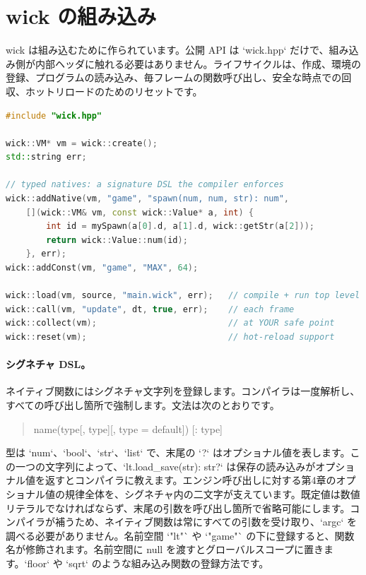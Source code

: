 \section{wick の組み込み}

wick は組み込むために作られています。公開 API は `wick.hpp` だけで、組み込み側が内部ヘッダに触れる必要はありません。ライフサイクルは、作成、環境の登録、プログラムの読み込み、毎フレームの関数呼び出し、安全な時点での回収、ホットリロードのためのリセットです。

\begin{lstlisting}[language=C++,basicstyle=\ttfamily\small,keywordstyle=\color{wkKeyword}]
#include "wick.hpp"

wick::VM* vm = wick::create();
std::string err;

// typed natives: a signature DSL the compiler enforces
wick::addNative(vm, "game", "spawn(num, num, str): num",
    [](wick::VM& vm, const wick::Value* a, int) {
        int id = mySpawn(a[0].d, a[1].d, wick::getStr(a[2]));
        return wick::Value::num(id);
    }, err);
wick::addConst(vm, "game", "MAX", 64);

wick::load(vm, source, "main.wick", err);   // compile + run top level
wick::call(vm, "update", dt, true, err);    // each frame
wick::collect(vm);                          // at YOUR safe point
wick::reset(vm);                            // hot-reload support
\end{lstlisting}

\paragraph{シグネチャ DSL。} ネイティブ関数にはシグネチャ文字列を登録します。コンパイラは一度解析し、すべての呼び出し箇所で強制します。文法は次のとおりです。

\begin{quote}
\ttfamily name(type[, type][, type = default]) [: type]
\end{quote}

\noindent
型は `num`、`bool`、`str`、`list` で、末尾の `?` はオプショナル値を表します。この一つの文字列によって、`lt.load_save(str): str?` は保存の読み込みがオプショナル値を返すとコンパイラに教えます。エンジン呼び出しに対する第4章のオプショナル値の規律全体を、シグネチャ内の二文字が支えています。既定値は数値リテラルでなければならず、末尾の引数を呼び出し箇所で省略可能にします。コンパイラが補うため、ネイティブ関数は常にすべての引数を受け取り、`argc` を調べる必要がありません。名前空間 `"lt"` や `"game"` の下に登録すると、関数名が修飾されます。名前空間に null を渡すとグローバルスコープに置きます。`floor` や `sqrt` のような組み込み関数の登録方法です。

